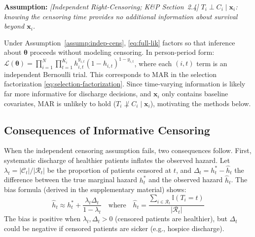 \documentclass[twoside,11pt]{article}
\newcommand{\ind}{\mathbb{I}}
\newcommand{\bx}{\mathbf{x}}
\newenvironment{assumption}[1][]{\vspace{0.5em}\noindent\textbf{Assumption#1:} \itshape}{\vspace{0.5em}}
\begin{document}
\begin{assumption}[][Independent Right-Censoring; K\&P Section~2.4]
  \label{assump:indep-cens}
  $T_i \perp C_i \mid \bx_i$: knowing the censoring time provides no additional information about survival beyond $\bx_i$.
\end{assumption}
 
Under Assumption~\ref{assump:indep-cens}, \eqref{eq:full-lik} factors so that inference about $\boldsymbol{\theta}$ proceeds without modeling censoring. In person-period form: $\mathcal{L}(\boldsymbol{\theta}) = \prod_{i=1}^N \prod_{t=1}^{K_i} h_{i,t}^{y_{i,t}} (1 - h_{i,t})^{1 - y_{i,t}}$, where each $(i,t)$ term is an independent Bernoulli trial. This corresponds to MAR in the selection factorization \eqref{eq:selection-factorization}. Since time-varying information is likely far more informative for discharge decisions, and $\bx_i$ only contains baseline covariates, MAR is unlikely to hold ($T_i \not\perp C_i \mid \bx_i$), motivating the methods below.
 
\subsection{Consequences of Informative Censoring}\label{sc:consequences}
When the independent censoring assumption fails, two consequences follow. First, systematic discharge of healthier patients inflates the observed hazard. Let $\lambda_t = |\mathcal{C}_t|/|\mathcal{R}_t|$ be the proportion of patients censored at $t$, and $\Delta_t = h_t^\ast - \hat{h}_t$ the difference between the true marginal hazard $h_t^\ast$ and the observed hazard $\hat{h}_t$. The bias formula (derived in the supplementary material) shows:
\begin{equation} \label{eq:bias-approx}
    \hat{h}_t \approx h_t^\ast + \frac{\lambda_t \Delta_t }{1-\lambda_t} \quad \text{where} \quad
    \hat{h}_t = \frac{ \sum_{i \in \mathcal{R}_t} \ind(T_i = t) }{ |\mathcal{R}_t| }
\end{equation}
The bias is positive when $\lambda_t, \Delta_t > 0$ (censored patients are healthier), but $\Delta_t$ could be negative if censored patients are sicker (e.g., hospice discharge).
 
\end{document}
